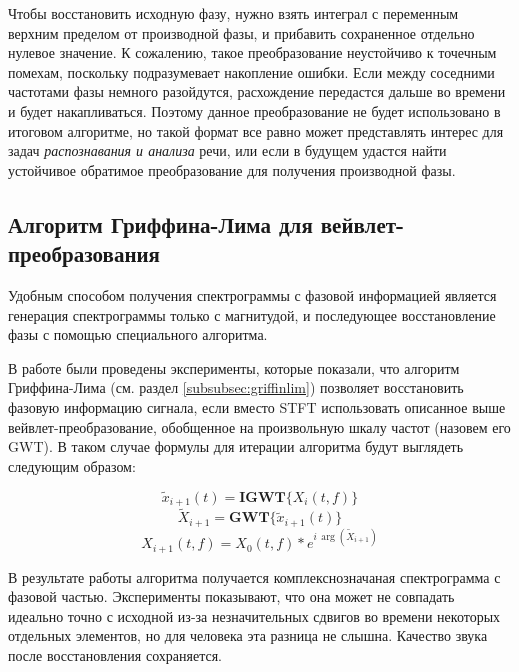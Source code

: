 Чтобы восстановить исходную фазу, нужно взять интеграл с переменным верхним пределом от производной фазы, 
и прибавить сохраненное отдельно нулевое значение. К сожалению, такое преобразование неустойчиво к точечным помехам, 
поскольку подразумевает накопление ошибки. Если между соседними частотами фазы немного разойдутся, 
расхождение передастся дальше во времени и будет накапливаться. Поэтому данное преобразование не будет использовано в итоговом алгоритме, 
но такой формат все равно может представлять интерес для задач \textit{распознавания и анализа} речи, или если в будущем удастся найти устойчивое 
обратимое преобразование для получения производной фазы.


\subsection{Алгоритм Гриффина-Лима для вейвлет-преобразования}

Удобным способом получения спектрограммы с фазовой информацией является генерация спектрограммы только с магнитудой, 
и последующее восстановление фазы с помощью специального алгоритма.

В работе были проведены эксперименты, которые показали, что алгоритм Гриффина-Лима (см. раздел \ref{subsubsec:griffinlim})
позволяет восстановить фазовую информацию сигнала, если вместо STFT использовать описанное выше 
вейвлет-преобразование, обобщенное на произвольную шкалу частот (назовем его GWT). В таком случае формулы для итерации алгоритма
будут выглядеть следующим образом:

\begin{equation}
  \tilde{x}_{i+1}(t) = \textbf{IGWT}\{X_i(t, f)\}
  \label{eq:griffin_lim_1}
\end{equation}
\begin{equation}
  \tilde{X}_{i+1} = \textbf{GWT}\{\tilde{x}_{i+1}(t)\}
  \label{eq:griffin_lim_2}
\end{equation}
\begin{equation}
  X_{i+1}(t, f) = X_0(t, f) * e^{i\,\arg(\tilde{X}_{i+1})}
  \label{eq:griffin_lim_3}
\end{equation}

В результате работы алгоритма получается комплекснозначаная спектрограмма с фазовой частью. 
Эксперименты показывают, что она может не совпадать идеально точно с исходной 
из-за незначительных сдвигов во времени некоторых отдельных элементов, но для человека эта разница не слышна.
Качество звука после восстановления сохраняется.

